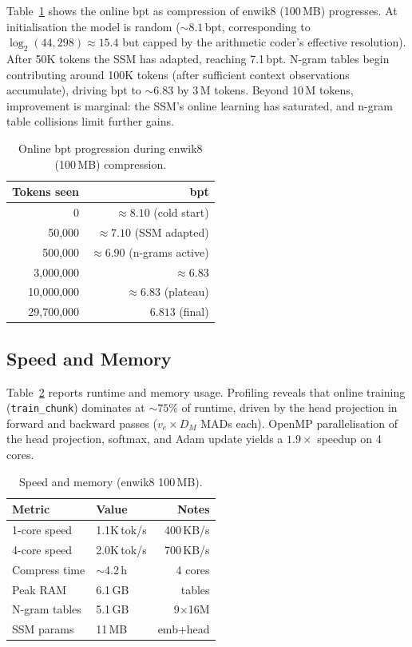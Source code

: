 \documentclass[10pt,twocolumn]{article}
\begin{document}
Table~\ref{tab:bpt} shows the online bpt as compression of
enwik8 (100\,MB) progresses.  At initialisation the model is
random (${\sim}8.1$\,bpt, corresponding to $\log_2(44{,}298)\approx 15.4$
but capped by the arithmetic coder's effective resolution).
After 50K tokens the SSM has adapted, reaching 7.1\,bpt.
N-gram tables begin contributing around 100K tokens (after
sufficient context observations accumulate), driving bpt to
${\sim}6.83$ by 3\,M tokens.  Beyond 10\,M tokens, improvement
is marginal: the SSM's online learning has saturated, and n-gram
table collisions limit further gains.

\begin{table}[h]
\centering
\small
\caption{Online bpt progression during enwik8 (100\,MB) compression.}
\label{tab:bpt}
\begin{tabular}{@{}rr@{}}
\toprule
\textbf{Tokens seen} & \textbf{bpt} \\
\midrule
0           & $\approx 8.10$ (cold start)    \\
50{,}000    & $\approx 7.10$ (SSM adapted)   \\
500{,}000   & $\approx 6.90$ (n-grams active) \\
3{,}000{,}000 & $\approx 6.83$ \\
10{,}000{,}000 & $\approx 6.83$ (plateau)   \\
29{,}700{,}000 & $6.813$ (final)           \\
\bottomrule
\end{tabular}
\end{table}

\subsection{Speed and Memory}

Table~\ref{tab:speed} reports runtime and memory usage.
Profiling reveals that online training (\texttt{train\_chunk}) dominates
at ${\sim}75\%$ of runtime, driven by the head projection in forward
and backward passes ($v_e\times D_M$ MADs each).
OpenMP parallelisation of the head projection, softmax, and Adam
update yields a $1.9\times$ speedup on 4 cores.

\begin{table}[h]
\centering
\small
\caption{Speed and memory (enwik8 100\,MB).}
\label{tab:speed}
\begin{tabular}{@{}llr@{}}
\toprule
\textbf{Metric} & \textbf{Value} & \textbf{Notes} \\
\midrule
1-core speed   & 1.1K\,tok/s & 400\,KB/s \\
4-core speed   & 2.0K\,tok/s & 700\,KB/s \\
Compress time  & ${\sim}$4.2\,h & 4 cores \\
Peak RAM       & 6.1\,GB & tables \\
N-gram tables  & 5.1\,GB & 9$\times$16M \\
SSM params     & 11\,MB & emb+head \\
\bottomrule
\end{tabular}
\end{table}
\end{document}
